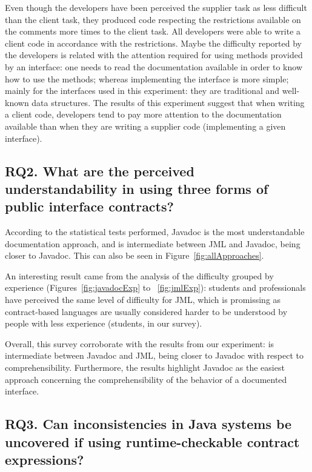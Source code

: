 Even though the developers have been perceived the supplier task as less
difficult than the client task, they produced code respecting the restrictions
available on the comments more times to the client task. All developers were
able to write a client code in accordance with the restrictions. Maybe the
difficulty reported by the developers is related with the attention required for
using methods provided by an interface: one needs to read the documentation
available in order to know how to use the methods; whereas implementing the
interface is more simple; mainly for the interfaces used in this experiment:
they are traditional and well-known data structures.
The results of this experiment suggest that when writing a client code,
developers tend to pay more attention to the documentation available than when
they are writing a supplier code (implementing a given interface).




\subsection{RQ2. What are the perceived understandability in using three forms of public interface contracts?}
\label{rq2}



According to the statistical tests performed, Javadoc is the most
understandable documentation approach, and \contractjdoc{} is intermediate between JML and
Javadoc, being closer to Javadoc.
This can also be seen in Figure~\ref{fig:allApproaches}.

An interesting result came from the analysis of the difficulty grouped by
experience (Figures~\ref{fig:javadocExp} to ~\ref{fig:jmlExp}): students and
professionals have perceived the same level of difficulty for JML, which is
promissing as contract-based languages are usually considered harder to be
understood by people with less experience (students, in our survey).

Overall, this survey corroborate with the results from our experiment: \contractjdoc{} is
intermediate between Javadoc and JML, being closer to Javadoc with respect to
comprehensibility.
Furthermore, the results highlight Javadoc as the easiest approach concerning the comprehensibility of
the behavior of a documented interface.


\subsection{RQ3. Can inconsistencies in Java systems be uncovered if using runtime-checkable contract expressions?}
\label{rq3}


